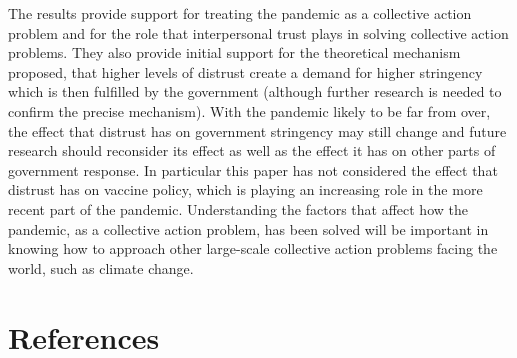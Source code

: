 \documentclass[
  12pt,
]{article}
\begin{document}
The results provide support for treating the pandemic as a collective action problem and for the role that interpersonal trust plays in solving collective action problems. They also provide initial support for the theoretical mechanism proposed, that higher levels of distrust create a demand for higher stringency which is then fulfilled by the government (although further research is needed to confirm the precise mechanism). With the pandemic likely to be far from over, the effect that distrust has on government stringency may still change and future research should reconsider its effect as well as the effect it has on other parts of government response. In particular this paper has not considered the effect that distrust has on vaccine policy, which is playing an increasing role in the more recent part of the pandemic. Understanding the factors that affect how the pandemic, as a collective action problem, has been solved will be important in knowing how to approach other large-scale collective action problems facing the world, such as climate change.\\

\newpage

\hypertarget{references}{%
\section*{References}\label{references}}
\end{document}
